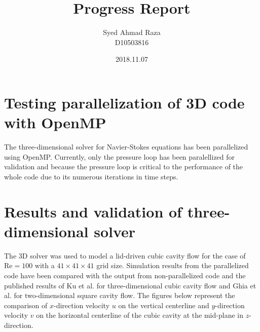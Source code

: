 \documentclass[12pt,a4paper,fleqn]{article}
\title{Progress Report}
\author{Syed Ahmad Raza\\
        D10503816}
\date{2018.11.07}
\begin{document}
\maketitle

\section{Testing parallelization of 3D code with OpenMP}

The three-dimensional solver for Navier-Stokes equations has been parallelized using OpenMP. Currently, only the pressure loop has been paralellized for validation and because the pressure loop is critical to the performance of the whole code due to its numerous iterations in time steps.

\section{Results and validation of three-dimensional solver}

The 3D solver was used to model a lid-driven cubic cavity flow for the case of \(\text{Re}=100\) with a \(41 \times 41 \times 41\) grid size. Simulation results from the parallelized code have been compared with the output from non-parallelized code and the published results of Ku et al. \cite{Ku:1987:PMS:33136.33145} for three-dimensional cubic cavity flow and Ghia et al. \cite{GHIA1982387} for two-dimensional square cavity flow. The figures below represent the comparison of \(x\)-direction velocity \(u\) on the vertical centerline and \(y\)-direction velocity \(v\) on the horizontal centerline of the cubic cavity at the mid-plane in \(z\)-direction.
\end{document}
